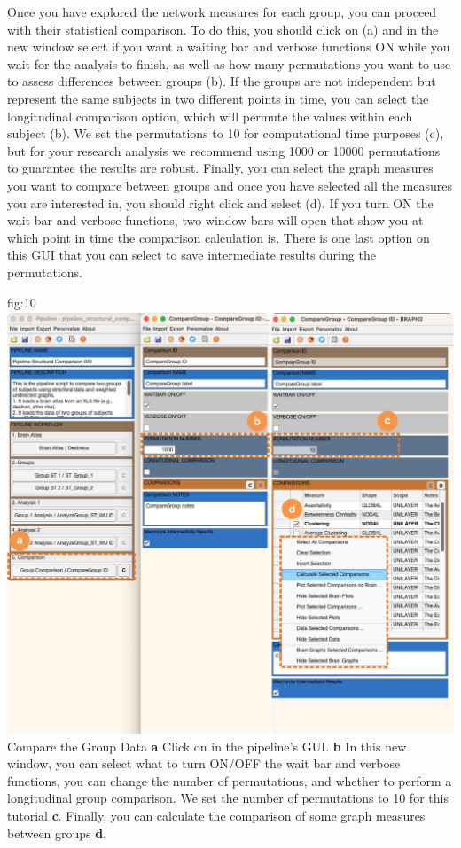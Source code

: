 \documentclass[justified]{tufte-handout}
\begin{document}
Once you have explored the network measures for each group, you can proceed with their statistical comparison. To do this, you should click on  (a) and in the new window select if you want a waiting bar and verbose functions ON while you wait for the analysis to finish, as well as how many permutations you want to use to assess differences between groups ({b}). If the groups are not independent but represent the same subjects in two different points in time, you can select the longitudinal comparison option, which will permute the values within each subject ({b}). We set the permutations to 10 for computational time purposes ({c}), but for your research analysis we recommend using 1000 or 10000 permutations to guarantee the results are robust. Finally, you can select the graph measures you want to compare between groups and once you have selected all the measures you are interested in, you should right click and select  ({d}). If you turn ON the wait bar and verbose functions, two window bars will open that show you at which point in time the comparison calculation is. There is one last option on this GUI that you can select to save intermediate results during the permutations.

	{fig:10}
	{\includegraphics{fig10.jpg}}
	{Compare the Group Data}
	{
	{\bf a} Click on  in the pipeline's GUI.
	{\bf b} In this new window, you can select what to turn ON/OFF the wait bar and verbose functions, you can change the number of permutations, and whether to perform a longitudinal group comparison. We set the number of permutations to 10 for this tutorial {\bf c}. Finally, you can calculate the comparison of some graph measures between groups {\bf d}.
	}
\end{document}
